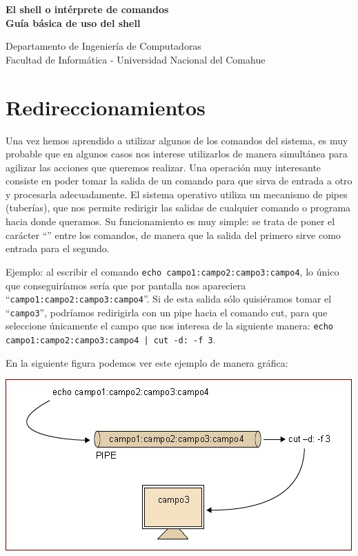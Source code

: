 \documentclass[12pt]{article}
\def\maketitle{

 \makeatletter
 {\color{bl} \centering \huge \sc \textbf{
 El shell o intérprete de comandos \\ 
\large \vspace*{-8pt} \color{black} Guía básica de uso del shell
 \vspace*{8pt} }\par}
 \makeatother


 \makeatletter
 {\centering \small 
 	Departamento de Ingeniería de Computadoras \\
 	Facultad de Informática - Universidad Nacional del Comahue \\
 	\vspace{20pt} }
 \makeatother

}
\begin{document}
\thispagestyle{empty}
\maketitle
\setlength{\parindent}{0pt}



\section{Redireccionamientos}

Una vez hemos aprendido a utilizar algunos de los comandos del sistema, es muy probable que en 
algunos casos nos interese utilizarlos de manera simultánea para agilizar las 
acciones que queremos realizar. Una operación muy interesante consiste en poder 
tomar la salida de un comando para que sirva de entrada a otro y procesarla adecuadamente. 
El sistema operativo utiliza un mecanismo de pipes (tuberías), que nos permite redirigir las salidas 
de cualquier comando o programa hacia donde queramos. Su funcionamiento es muy simple: se trata de poner el 
carácter ``\textbar'' entre los comandos, de manera que la salida del primero sirve como
 entrada para el segundo.

Ejemplo: al escribir el comando 
\texttt{echo campo1:campo2:campo3:campo4}, lo único que conseguiríamos sería que por 
pantalla nos apareciera ``\texttt{campo1:campo2:campo3:campo4}''. Si de esta salida sólo 
quisiéramos tomar el  ``\texttt{campo3}'', podríamos redirigirla con un pipe hacia el 
comando cut, para que seleccione únicamente el campo que nos interesa de la siguiente manera: 
\texttt{echo campo1:campo2:campo3:campo4 | cut -d: -f 3}. 

En la siguiente figura podemos ver este ejemplo de manera gráfica:

\begin{center}
 \includegraphics{./img/redireccionamiento.jpg}
\end{center}
\end{document}
